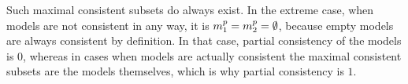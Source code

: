 \begin{definition}
\end{definition}

Such maximal consistent subsets do always exist.
In the extreme case, when models are not consistent in any way, it is $m_{1}^p = m_{2}^p = \emptyset$, because empty models are always consistent by definition.
In that case, partial consistency of the models is $0$, whereas in cases when models are actually consistent the maximal consistent subsets are the models themselves, which is why partial consistency is $1$.




